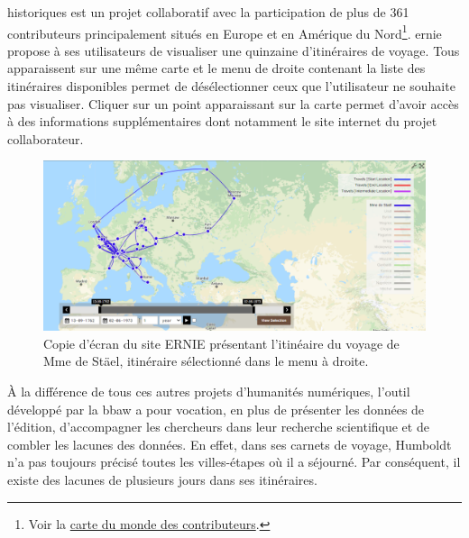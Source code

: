 \documentclass[a4paper, 12pt, twoside]{book}
\begin{document}
historiques est un projet collaboratif avec la participation de plus de 361 contributeurs principalement situés en Europe et en Amérique du Nord\footnote{Voir la \href{https://ernie.uva.nl/viewer.p/21/68/scenario/125/geo}{carte du monde des contributeurs}.}. \gls{ernie} propose à ses utilisateurs de visualiser une quinzaine d'itinéraires de voyage. Tous apparaissent sur une même carte et le menu de droite contenant la liste des itinéraires disponibles permet de désélectionner ceux que l'utilisateur ne souhaite pas visualiser. Cliquer sur un point apparaissant sur la carte permet d'avoir accès à des informations supplémentaires dont notamment le site internet du projet collaborateur.
\begin{figure}[h!]
\centering
\includegraphics[scale=0.5]{img/ernie_stael.png}
\caption{Copie d'écran du site ERNIE présentant l'itinéaire du voyage de Mme de Stäel, itinéraire sélectionné dans le menu à droite.}
\end{figure}

À la différence de tous ces autres projets d'humanités numériques, l'outil développé par la \gls{bbaw} a pour vocation, en plus de présenter les données de l'édition, d'accompagner les chercheurs dans leur recherche scientifique et de combler les lacunes des données. En effet, dans ses carnets de voyage, Humboldt n'a pas toujours précisé toutes les villes-étapes où il a séjourné. Par conséquent, il existe des lacunes de plusieurs jours dans ses itinéraires.
\end{document}
